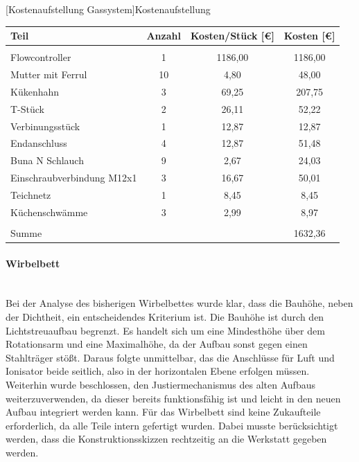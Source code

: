 \begin{center}
	[Kostenaufstellung Gassystem]{Kostenaufstellung}
		\vspace{0.25cm}
	\begin{tabular}{|l|S|S|S|}
		{Teil}  & {Anzahl} & {Kosten/Stück [\euro]} & {Kosten [\euro]} \\
		\hline
		&       &       &  \\
		{Flowcontroller} & 1     & 1186,00  & 1186,00 \\
		{Mutter mit Ferrul} & 10    & 4,80   & 48,00 \\
		{Kükenhahn} & 3     & 69,25 & 207,75 \\
		{T-Stück} & 2     & 26,11 & 52,22 \\
		{Verbinungsstück} & 1     & 12,87 & 12,87 \\
		{Endanschluss} & 4     & 12,87 & 51,48 \\
		{Buna N Schlauch} & 9     & 2,67  & 24,03 \\
		{Einschraubverbindung M12x1} & 3     & 16,67 & 50,01 \\
		{Teichnetz} & 1     & 8,45  & 8,45 \\
		{Küchenschwämme} & 3     & 2,99  & 8,97 \\
		\hline 
		&       &       &  \\
		{Summe} &       &       & 1632,36 \\
	\end{tabular}
\end{center}

\vspace{0.5cm}

\paragraph{Wirbelbett}
\hfill \\
Bei der Analyse des bisherigen Wirbelbettes wurde klar, dass die Bauhöhe, neben der Dichtheit, ein entscheidendes Kriterium ist. Die Bauhöhe ist durch den Lichtstreuaufbau begrenzt. Es handelt sich um eine Mindesthöhe über dem Rotationsarm und eine Maximalhöhe, da der Aufbau sonst gegen einen Stahlträger stößt. Daraus folgte unmittelbar, das die Anschlüsse für Luft und Ionisator beide seitlich, also in der horizontalen Ebene erfolgen müssen. \\
Weiterhin wurde beschlossen, den Justiermechanismus des alten Aufbaus weiterzuverwenden, da dieser bereits funktionsfähig ist und leicht in den neuen Aufbau integriert werden kann. Für das Wirbelbett sind keine Zukaufteile erforderlich, da alle Teile intern gefertigt wurden. Dabei musste berücksichtigt werden, dass die Konstruktionsskizzen rechtzeitig an die Werkstatt gegeben werden. 


